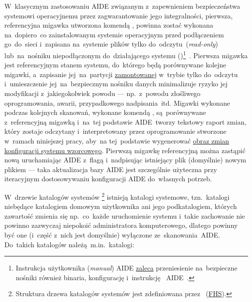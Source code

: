 \documentclass[thesis]{subfiles}
\begin{document}
W~klasycznym zastosowaniu AIDE związanym z~zapewnieniem bezpieczeństwa systemowi operacyjnemu przez zagwarantowanie jego integralności, pierwsza, referencyjna migawka utworzona komendą , powinna zostać wykonana na~dopiero~co zainstalowanym systemie operacyjnym przed podłączeniem go~do~sieci i~zapisana na~systemie plików tylko do~odczytu~(\emph{read-only}) lub~na~nośniku niepodłączonym do~działającego systemu ()\footnote{Instrukcja użytkownika (\emph{\gls{manual}}) AIDE \href{http://aide.sourceforge.net/stable/manual.html\#usage}{zaleca} przeniesienie na~bezpieczne nośniki również binaria, konfigurację i~instrukcję ~AIDE~\cite{aide-manual}.}~\cite{aide-manual}. Pierwsza migawka jest referencyjnym stanem systemu, do~którego będą porównywane kolejne migawki, a~zapisanie jej~na~partycji \href{https://linux.die.net/man/8/mount}{zamontowanej} w~trybie tylko do~odczytu i~umieszczenie jej~na~bezpiecznym nośniku danych minimalizuje ryzyko jej modyfikacji z~jakiegokolwiek powodu --- np.~z~powodu złośliwego oprogramowania, awarii, przypadkowego nadpisania~itd. Migawki wykonane podczas kolejnych skanowań, wykonane komendą , są~porównywane z~referencyjną migawką i~na~tej podstawie AIDE~tworzy tekstowy raport zmian, który zostaje odczytany i~interpretowany przez oprogramowanie stworzone w~ramach niniejszej pracy, aby~na tej~podstawie wygenerować \hyperref[sec:obraz-zmian-konfiguracji]{obraz zmian konfiguracji systemu wzorcowego}. Pierwszą migawkę referencyjną można zastąpić nową uruchamiając AIDE z~flagą  i~nadpisując istniejący plik (domyślnie)  nowym plikiem  --- taka aktualizacja bazy AIDE jest szczególnie użyteczna przy iteracyjnym dostosowywaniu konfiguracji AIDE  do~własnych potrzeb.

W~drzewie katalogów systemów \footnote{Struktura drzewa katalogów systemów  jest zdefiniowana przez ~(\href{http://www.tldp.org/LDP/sag/html/fs-background.html}{FHS}).} istnieją katalogi systemowe, tzn.~katalogi niebędące katalogiem domowym użytkownika ani jego podkatalogiem, których zawartość zmienia się np.~co~każde uruchomienie systemu i~takie zachowanie nie powinno zazwyczaj niepokoić administratora komputerowego, dlatego powinny być one (i~część z~nich jest domyślnie) wyłączone ze~skanowania~AIDE. Do~takich katalogów należą~m.in.~katalogi:\mynobreakpar
\end{document}
